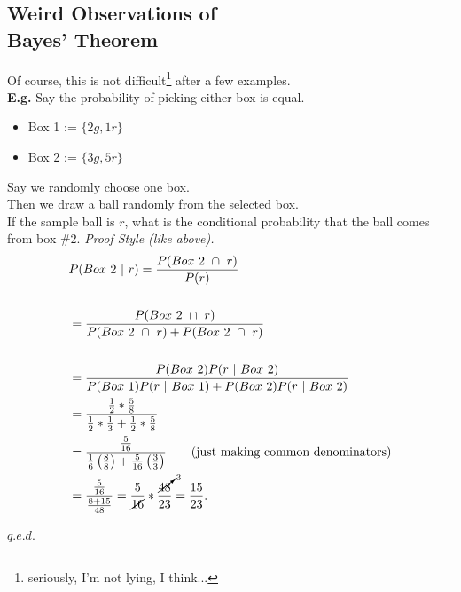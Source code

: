 \documentclass[12pt]{book}
\begin{document}
\subsection{Weird Observations of\\ Bayes' Theorem}
Of course, this is not difficult\footnote{seriously, I'm not lying, I think...} after a few examples.\\
\textbf{E.g. } Say the probability of picking either box is equal.
\begin{itemize}
\item Box 1 := $\{2g,1r\}$\\
\item Box 2 := $\{3g,5r\}$\\
\end{itemize}
\noindent Say we randomly choose one box.\\
Then we draw a ball randomly from the selected box.\\
If the sample ball is $r$, what is the conditional probability 
that the ball comes from box \#2.
\newpage
\noindent \textit{Proof Style (like above). }\\
\begin{align*}
&P(Box~2~|~r)=\dfrac{P(Box~2~\cap~r)}{P(r)} \\\\
&=\dfrac{P(Box~2~\cap~r)}{P(Box~2~\cap~r)+P(Box~2~\cap~r)} \\\\
&=\dfrac{P(Box~2)P(r~|~Box~2)}{P(Box~1)P(r~|~Box~1)+P(Box~2)P(r~|~Box~2)}\\
&=\dfrac{\frac{1}{2}* \frac{5}{8}}{\frac{1}{2} * \frac{1}{3} + \frac{1}{2} * \frac{5}{8}}\\
&=\dfrac{\frac{5}{16}}{\frac{1}{6}\left(\frac{8}{8}\right) + \frac{5}{16}\left(\frac{3}{3}\right)}\tag{just making common denominators}\\
&=\dfrac{\frac{5}{16}}{\frac{8+15}{48}}=\frac{5}{\cancel{16}}* \dfrac{\cancelto{3}{48}}{23}=\dfrac{15}{23}.
\end{align*}

\hfill $q.e.d.$\\
\end{document}
